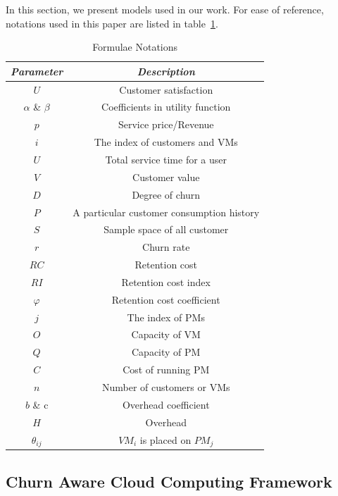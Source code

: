 In this section, we present models used in our work. For ease of reference, notations used in this paper are listed in table~\ref{tablen}.

\begin{table}[!h]
\caption{Formulae Notations }
\label{tablen}
\centering
\begin{tabular}{|c|c|}

\hline
\textit{\textbf{Parameter}}&\textit{\textbf{Description}}\\
\hline
\hline
$U$&Customer satisfaction\\
\hline
$\alpha$ \& $\beta$&Coefficients in utility function\\
\hline
$p$&Service price/Revenue\\
\hline
$i$&The index of customers and VMs\\
\hline
$U$& Total service time for a user\\
\hline
$V$&Customer value\\
\hline
$D$&Degree of churn\\
\hline
$P$&A particular customer consumption history\\
\hline
$S$&Sample space of all customer\\
\hline
$r$&Churn rate\\
\hline
$RC$&Retention cost\\
\hline
$RI$&Retention cost index\\
\hline
$\varphi$&Retention cost coefficient\\
\hline
$j$&The index of PMs\\
\hline
$O$&Capacity of VM\\
\hline
$Q$&Capacity of PM\\
\hline
$C$&Cost of running PM\\
\hline
$n$&Number of customers or VMs\\
\hline
$b$ \& c& Overhead coefficient\\
\hline
$H$&Overhead\\
\hline
$\theta_{ij}$&$VM_i$ is placed on $PM_j$\\
\hline
\end{tabular}
\end{table}

\subsection{Churn Aware Cloud Computing Framework}


